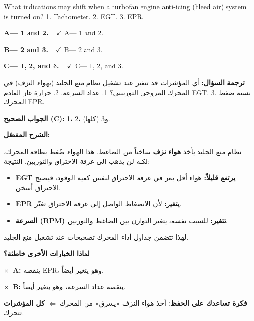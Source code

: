 \documentclass[11pt,a4paper]{article}
\newcommand{\en}[1]{\textenglish{#1}}
\newcommand{\correctletter}{}
\newcommand{\opt}[2]{%
  \ifdefstring{\correctletter}{#1}%
    {\textcolor{ansgreen}{\textbf{#1— #2\ \ $\checkmark$}}}%
    {#1— #2}\par}
\newcommand{\Q}[6]{%
  \renewcommand{\correctletter}{#6}%
  \par\bigskip
  \phantomsection\label{q#1}%
  \begin{tcolorbox}[enhanced,breakable,colback=qback,colframe=qframe,
      arc=2mm,boxrule=0.8pt,fonttitle=\bfseries,
      title={\en{Question #1}}]
    \begin{english}
      #2\par\smallskip
      \opt{A}{#3}\opt{B}{#4}\opt{C}{#5}
    \end{english}
  \end{tcolorbox}}
\newcommand{\tr}[1]{\textbf{\textcolor{qframe}{ترجمة السؤال:}} #1\par}
\newcommand{\ans}[2]{%
  \begin{tcolorbox}[colback=ansback,colframe=ansgreen,boxrule=0.6pt,arc=1.5mm,
      left=4pt,right=4pt,top=2pt,bottom=2pt]
    \textbf{\textcolor{ansgreen}{الجواب الصحيح (\en{#1}):}} #2
  \end{tcolorbox}}
\newcommand{\sharh}[1]{\textbf{\textcolor{conceptc}{الشرح المفصّل:}}\par #1\par}
\newcommand{\nohead}{\textbf{\textcolor{wrongc}{لماذا الخيارات الأخرى خاطئة؟}}\par}
\newcommand{\no}[2]{\hspace*{1em}\textcolor{wrongc}{$\times$}\ \textbf{\en{#1}:} #2\par}
\newcommand{\tip}[1]{%
  \begin{tcolorbox}[colback=tipback,colframe=tipframe,boxrule=0.5pt,arc=1.5mm,
      left=4pt,right=4pt,top=2pt,bottom=2pt]
    \textbf{فكرة تساعدك على الحفظ:} #1
  \end{tcolorbox}}
\begin{document}
\Q{8801}{What indications may shift when a turbofan engine anti-icing (bleed air) system is turned on? 1. Tachometer. 2. EGT. 3. EPR.}
{1 and 2.}
{2 and 3.}
{1, 2, and 3.}{C}
\tr{أي المؤشرات قد تتغير عند تشغيل نظام منع الجليد (بهواء النزف) في المحرك المروحي التوربيني؟ 1. عداد السرعة. 2. حرارة غاز العادم \en{EGT}. 3. نسبة ضغط المحرك \en{EPR}.}
\ans{C}{1، 2، و3 (كلها).}
\sharh{نظام منع الجليد يأخذ \textbf{هواء نزف} ساخناً من الضاغط. هذا الهواء ضُغط بطاقة المحرك، لكنه لن يذهب إلى غرفة الاحتراق والتوربين. النتيجة:
\begin{itemize}
  \item \textbf{\en{EGT} يرتفع قليلاً:} هواء أقل يمر في غرفة الاحتراق لنفس كمية الوقود، فيصبح الاحتراق أسخن.
  \item \textbf{\en{EPR} يتغير:} لأن الانضغاط الواصل إلى غرفة الاحتراق تغيّر.
  \item \textbf{السرعة (\en{RPM}) تتغير:} للسبب نفسه، يتغير التوازن بين الضاغط والتوربين.
\end{itemize}
لهذا تتضمن جداول أداء المحرك تصحيحات عند تشغيل منع الجليد.}
\nohead
\no{A}{ينقصه \en{EPR}، وهو يتغير أيضاً.}
\no{B}{ينقصه عداد السرعة، وهو يتغير أيضاً.}
\tip{أخذ هواء النزف «يسرق» من المحرك $\Leftarrow$ \textbf{كل المؤشرات} تتحرك.}

\newpage
\end{document}

